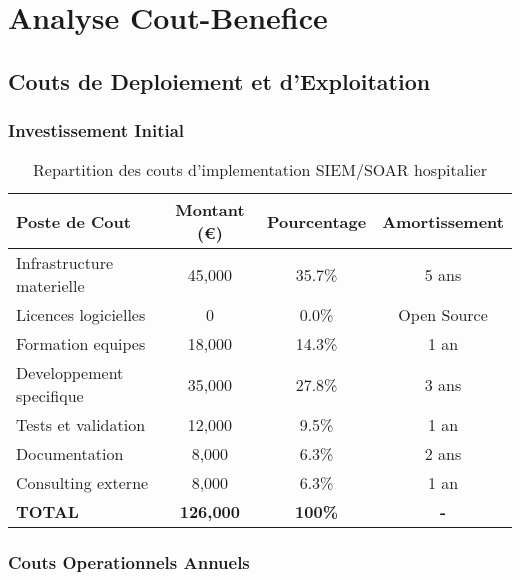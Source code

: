 \section{Analyse Cout-Benefice}

\subsection{Couts de Deploiement et d'Exploitation}

\subsubsection{Investissement Initial}

\begin{table}[H]
    \centering
    \caption{Repartition des couts d'implementation SIEM/SOAR hospitalier}
    \begin{tabular}{|l|c|c|c|}
        \hline
        \textbf{Poste de Cout}    & \textbf{Montant (€)} & \textbf{Pourcentage} & \textbf{Amortissement} \\
        \hline
        Infrastructure materielle & 45,000               & 35.7\%               & 5 ans                  \\
        \hline
        Licences logicielles      & 0                    & 0.0\%                & Open Source            \\
        \hline
        Formation equipes         & 18,000               & 14.3\%               & 1 an                   \\
        \hline
        Developpement specifique  & 35,000               & 27.8\%               & 3 ans                  \\
        \hline
        Tests et validation       & 12,000               & 9.5\%                & 1 an                   \\
        \hline
        Documentation             & 8,000                & 6.3\%                & 2 ans                  \\
        \hline
        Consulting externe        & 8,000                & 6.3\%                & 1 an                   \\
        \hline
        \textbf{TOTAL}            & \textbf{126,000}     & \textbf{100\%}       & \textbf{-}             \\
        \hline
    \end{tabular}
\end{table}

\subsubsection{Couts Operationnels Annuels}


